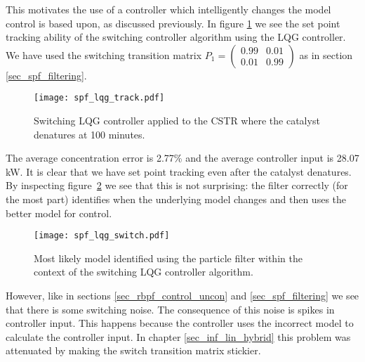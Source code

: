 This motivates the use of a controller which intelligently changes the model control is based upon, as discussed previously. In figure \ref{fig_spf_lqg_track} we see the set point tracking ability of the switching controller algorithm using the LQG controller. We have used the switching transition matrix $P_1=\begin{pmatrix}
0.99 & 0.01 \\ 0.01 & 0.99
\end{pmatrix}$ as in section \ref{sec_spf_filtering}.
\begin{figure}[H] 
\centering
\texttt{[image: spf\_lqg\_track.pdf]}
\caption{Switching LQG controller applied to the CSTR where the catalyst denatures at 100 minutes.}
\label{fig_spf_lqg_track}
\end{figure}
The average concentration error is 2.77\% and the average controller input is 28.07 kW. It is clear that we have set point tracking even after the catalyst denatures. By inspecting figure~\ref{fig_spf_lqg_switch} we see that this is not surprising: the filter correctly (for the most part) identifies when the underlying model changes and then uses the better model for control. 
\begin{figure}[H] 
\centering
\texttt{[image: spf\_lqg\_switch.pdf]}
\caption{Most likely model identified using the particle filter within the context of the switching LQG controller algorithm.}
\label{fig_spf_lqg_switch}
\end{figure}
However, like in sections \ref{sec_rbpf_control_uncon} and \ref{sec_spf_filtering} we see that there is some switching noise. The consequence of this noise is spikes in controller input. This happens because the controller uses the incorrect model to calculate the controller input. In chapter \ref{sec_inf_lin_hybrid} this problem was attenuated by making the switch transition matrix stickier. 

